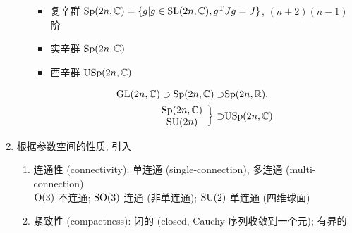 \documentclass[12pt,a4paper]{article}%
\numberwithin{equation}{section}%
\begin{document}
\begin{enumerate}
\begin{enumerate}
		\begin{itemize}
			\item 复辛群 $\mathrm{Sp}(2n,\mathbb C) = \{g|g\in\mathrm{SL}(2n,\mathbb C), g^\mathrm{T} J g = J\}$, $(n+2)(n-1)$ 阶
			\item 实辛群 $\mathrm{Sp}(2n,\mathbb C)$
			\item 酉辛群 $\mathrm{USp}(2n,\mathbb C)$
		\end{itemize}
		\begin{align}
			\mathrm{GL}(2n,\mathbb C)\supset\mathrm{Sp}(2n,\mathbb C)\supset & \mathrm{Sp}(2n,\mathbb R), \\
			\left.\begin{array}{c}
				\mathrm{Sp}(2n,\mathbb C) \\
				\mathrm{SU}(2n)
			\end{array}\right\}\supset&\mathrm{USp}(2n,\mathbb C)
		\end{align}
	\end{enumerate}
	\item 根据参数空间的性质, 引入
	\begin{enumerate}
		\item 连通性 (connectivity): 单连通 (single-connection), 多连通 (multi-connection) \\
		$\mathrm{O}(3)$ 不连通; $\mathrm{SO}(3)$ 连通 (非单连通); $\mathrm{SU}(2)$ 单连通 (四维球面)
		\item 紧致性 (compactness): 闭的 (closed, Cauchy 序列收敛到一个元); 有界的
	\end{enumerate} 
\end{enumerate}
\end{document}
